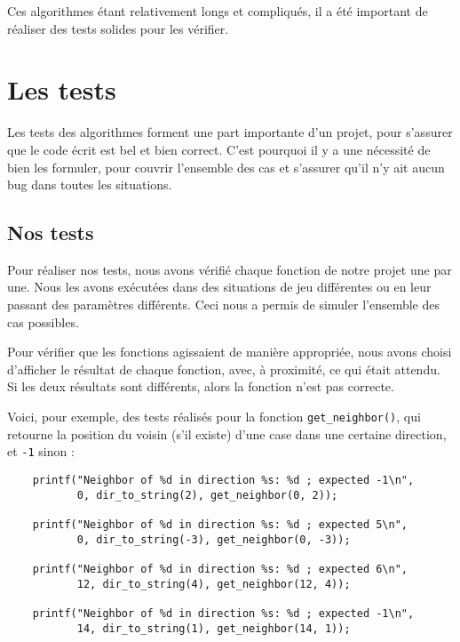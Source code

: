 \documentclass[a4paper]{article}
\begin{document}
\vspace{0.5cm}

Ces algorithmes étant relativement longs et compliqués, il a été important de réaliser des tests solides pour les vérifier.

\section{Les tests}
\label{tests}

Les tests des algorithmes forment une part importante d'un projet, pour s'assurer que le code écrit est bel et bien correct. C'est pourquoi il y a une nécessité de bien les formuler, pour couvrir l'ensemble des cas et s'assurer qu'il n'y ait aucun bug dans toutes les situations.

\subsection{Nos tests}
\label{nos test}

Pour réaliser nos tests, nous avons vérifié chaque fonction de notre projet une par une. Nous les avons exécutées dans des situations de jeu différentes ou en leur passant des paramètres différents. Ceci nous a permis de simuler l'ensemble des cas possibles.

Pour vérifier que les fonctions agissaient de manière appropriée, nous avons choisi d'afficher le résultat de chaque fonction, avec, à proximité, ce qui était attendu. Si les deux résultats sont différents, alors la fonction n'est pas correcte.

Voici, pour exemple, des tests réalisés pour la fonction \verb|get_neighbor()|, qui retourne la position du voisin (s'il existe) d'une case dans une certaine direction, et \verb|-1| sinon :

\begin{verbatim}
    printf("Neighbor of %d in direction %s: %d ; expected -1\n",
           0, dir_to_string(2), get_neighbor(0, 2));
           
    printf("Neighbor of %d in direction %s: %d ; expected 5\n",
           0, dir_to_string(-3), get_neighbor(0, -3));
           
    printf("Neighbor of %d in direction %s: %d ; expected 6\n",
           12, dir_to_string(4), get_neighbor(12, 4));
           
    printf("Neighbor of %d in direction %s: %d ; expected -1\n",
           14, dir_to_string(1), get_neighbor(14, 1));
\end{verbatim}
\end{document}
